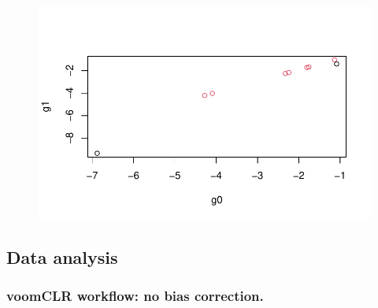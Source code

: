 \documentclass[
  letterpaper,
  DIV=11,
  numbers=noendperiod]{scrartcl}
\newenvironment{Shaded}{\begin{snugshade}}{\end{snugshade}}
\newcommand{\AttributeTok}[1]{\textcolor[rgb]{0.40,0.45,0.13}{#1}}
\newcommand{\CommentTok}[1]{\textcolor[rgb]{0.37,0.37,0.37}{#1}}
\newcommand{\DecValTok}[1]{\textcolor[rgb]{0.68,0.00,0.00}{#1}}
\newcommand{\FloatTok}[1]{\textcolor[rgb]{0.68,0.00,0.00}{#1}}
\newcommand{\FunctionTok}[1]{\textcolor[rgb]{0.28,0.35,0.67}{#1}}
\newcommand{\NormalTok}[1]{\textcolor[rgb]{0.00,0.23,0.31}{#1}}
\newcommand{\OtherTok}[1]{\textcolor[rgb]{0.00,0.23,0.31}{#1}}
\newcommand{\SpecialCharTok}[1]{\textcolor[rgb]{0.37,0.37,0.37}{#1}}
\begin{document}
\begin{figure}[H]

{\centering \includegraphics{221215_simulationCLRBias_files/figure-pdf/unnamed-chunk-2-2.pdf}

}

\end{figure}

\begin{Shaded}
\end{Shaded}

\hypertarget{data-analysis}{%
\subsection{Data analysis}\label{data-analysis}}

\hypertarget{voomclr-workflow-no-bias-correction.}{%
\subsubsection{voomCLR workflow: no bias
correction.}\label{voomclr-workflow-no-bias-correction.}}
\end{document}
